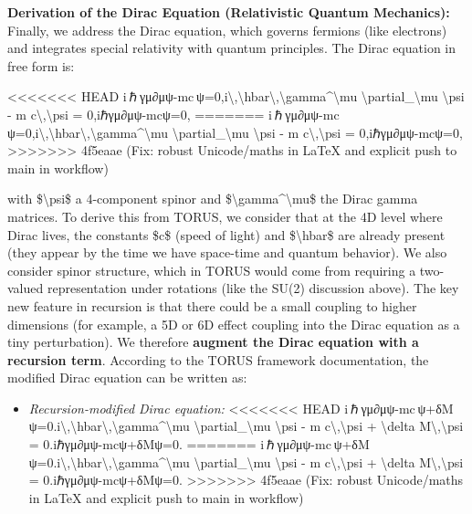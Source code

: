 \documentclass[]{article}
\begin{document}
\textbf{Derivation of the Dirac Equation (Relativistic Quantum
Mechanics):} Finally, we address the Dirac equation, which governs
fermions (like electrons) and integrates special relativity with quantum
principles. The Dirac equation in free form is:

<<<<<<< HEAD
i ℏ γμ∂μψ-mc ψ=0,i\textbackslash,\textbackslash hbar\textbackslash,\textbackslash gamma\^{}\textbackslash mu
\textbackslash partial\_\textbackslash mu \textbackslash psi - m
c\textbackslash,\textbackslash psi = 0,iℏγμ∂μ\hspace{0pt}ψ-mcψ=0,
=======
i ℏ γμ∂μψ-mc ψ=0,i\textbackslash{},\textbackslash{}hbar\textbackslash{},\textbackslash{}gamma\^{}\textbackslash{}mu
\textbackslash{}partial\_\textbackslash{}mu \textbackslash{}psi - m
c\textbackslash{},\textbackslash{}psi = 0,iℏγμ∂μ​ψ-mcψ=0,
>>>>>>> 4f5eaae (Fix: robust Unicode/maths in LaTeX and explicit push to main in workflow)

with \$\textbackslash{}psi\$ a 4-component spinor and
\$\textbackslash{}gamma\^{}\textbackslash{}mu\$ the Dirac gamma
matrices. To derive this from TORUS, we consider that at the 4D level
where Dirac lives, the constants \$c\$ (speed of light) and
\$\textbackslash{}hbar\$ are already present (they appear by the time we
have space-time and quantum behavior). We also consider spinor
structure, which in TORUS would come from requiring a two-valued
representation under rotations (like the SU(2) discussion above). The
key new feature in recursion is that there could be a small coupling to
higher dimensions (for example, a 5D or 6D effect coupling into the
Dirac equation as a tiny perturbation). We therefore \textbf{augment the
Dirac equation with a recursion term}. According to the TORUS framework
documentation, the modified Dirac equation can be written as​:

\begin{itemize}
\item
  \emph{Recursion-modified Dirac equation:}
<<<<<<< HEAD
  i ℏ γμ∂μψ-mc ψ+δM ψ=0.i\textbackslash,\textbackslash hbar\textbackslash,\textbackslash gamma\^{}\textbackslash mu
  \textbackslash partial\_\textbackslash mu \textbackslash psi - m
  c\textbackslash,\textbackslash psi + \textbackslash delta
  M\textbackslash,\textbackslash psi = 0.iℏγμ∂μ\hspace{0pt}ψ-mcψ+δMψ=0.
=======
  i ℏ γμ∂μψ-mc ψ+δM ψ=0.i\textbackslash{},\textbackslash{}hbar\textbackslash{},\textbackslash{}gamma\^{}\textbackslash{}mu
  \textbackslash{}partial\_\textbackslash{}mu \textbackslash{}psi - m
  c\textbackslash{},\textbackslash{}psi + \textbackslash{}delta
  M\textbackslash{},\textbackslash{}psi = 0.iℏγμ∂μ​ψ-mcψ+δMψ=0.
>>>>>>> 4f5eaae (Fix: robust Unicode/maths in LaTeX and explicit push to main in workflow)
\end{itemize}
\end{document}
